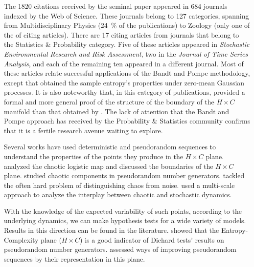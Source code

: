 \documentclass[alpha-refs]{wiley-article}
\begin{document}
The \num{1820} citations received by the seminal paper appeared in \num{684} journals indexed by the Web of Science.
These journals belong to \num{127} categories, spanning from Multidisciplinary Physics (\SI{24}{\percent} of the publications) to Zoology (only one of the of citing articles).
There are \num{17} citing articles from journals that belong to the Statistics \& Probability category.
Five of these articles appeared in \textit{Stochastic Environmental Research and Risk Assessment}, 
two in the \textit{Journal of Time Series Analysis}, 
and each of the remaining ten appeared in a different journal.
Most of these articles relate successful applications of the Bandt and Pompe methodology, except \cite{OrdinalPatternProbabilities} that obtained the sample entropy's properties under zero-mean Gaussian processes.
It is also noteworthy that, in this category of publications, \cite{DistributionsofOrderPatternsofIntervalMaps} provided a formal and more general proof of the structure of the boundary of the $H\times C$ manifold than that obtained by \cite{martin2006generalized}.
The lack of attention that the Bandt and Pompe approach has received by the Probability \& Statistics community confirms that it is a fertile research avenue waiting to explore.

Several works have used deterministic and pseudorandom sequences to understand the properties of the points they produce in the $H\times C$ plane.
\cite{martin2006generalized} analyzed the chaotic logistic map and discussed the boundaries of the $H \times C$ plane.
\cite{De_Micco_2009} studied chaotic components in pseudorandom number generators.
\cite{DistinguishingNoiseFromChaos}  tackled the often hard problem of distinguishing chaos from noise.
\cite{DistinguishingChaoticStochasticDynamicsTimeSeriesMultiscaleSymbolicApproach} used a multi-scale approach to analyze the interplay between chaotic and stochastic dynamics.

With the knowledge of the expected variability of such points, according to the underlying dynamics, we can make hypothesis tests for a wide variety of models.
Results in this direction can be found in the literature.
\cite{RandomNumberGeneratorsCausality} showed that the Entropy-Complexity plane ($H\times C$) is a good indicator of Diehard tests' results on pseudorandom number generators.
\cite{De_Micco_2008} assessed ways of improving pseudorandom sequences by their representation in this plane.
\end{document}
